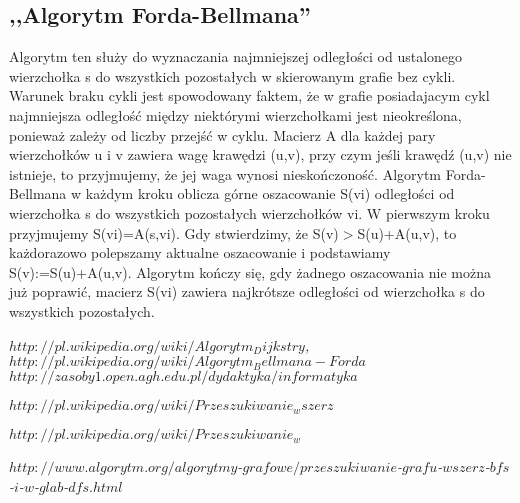 \documentclass[11pt]{article} %
\begin{document}
\subsection{,,Algorytm Forda-Bellmana''}
Algorytm ten służy do wyznaczania najmniejszej odległości od ustalonego wierzchołka s do wszystkich pozostałych w skierowanym grafie bez cykli.
Warunek braku cykli jest spowodowany faktem, że w grafie posiadajacym cykl najmniejsza odległość między niektórymi wierzchołkami jest nieokreślona, ponieważ zależy od liczby przejść w cyklu.
 Macierz A dla każdej pary wierzchołków u i v zawiera wagę krawędzi (u,v), przy czym jeśli krawędź (u,v) nie istnieje, to przyjmujemy, że jej waga wynosi nieskończoność. Algorytm Forda-Bellmana w każdym kroku oblicza górne oszacowanie S(vi) odległości od wierzchołka s do wszystkich pozostałych wierzchołków vi. W pierwszym kroku przyjmujemy S(vi)=A(s,vi). Gdy stwierdzimy, że S(v)$>$S(u)+A(u,v), to każdorazowo polepszamy aktualne oszacowanie i podstawiamy S(v):=S(u)+A(u,v). Algorytm kończy się, gdy żadnego oszacowania nie można już poprawić, macierz S(vi) zawiera najkrótsze odległości od wierzchołka s do wszystkich pozostałych.
 \newpage
\begin{thebibliography}{99}
\emph{$ http://pl.wikipedia.org/wiki/Algorytm_Dijkstry$,}
\emph{$http://pl.wikipedia.org/wiki/Algorytm_Bellmana-Forda$}
\emph{$http://zasoby1.open.agh.edu.pl/dydaktyka/informatyka$}

\emph{$http://pl.wikipedia.org/wiki/Przeszukiwanie_wszerz$}

\emph{$http://pl.wikipedia.org/wiki/Przeszukiwanie_w$}

\emph{$http://www.algorytm.org/algorytmy$-$grafowe/przeszukiwanie$-$grafu$-$wszerz$-$bfs$-$i$-$w$-$glab$-$dfs.html$}
\end{thebibliography}
\end{document}
